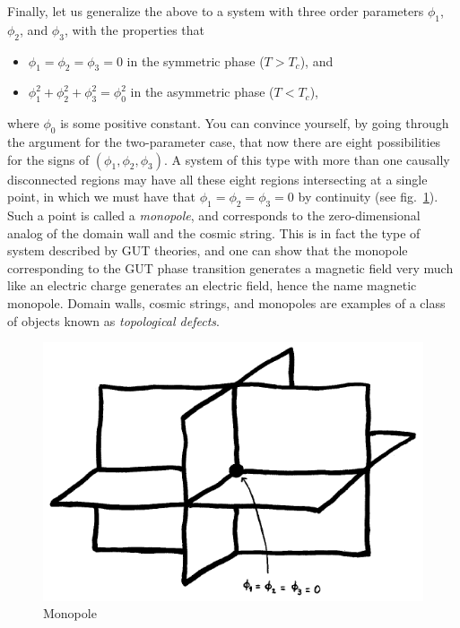 Finally, let us generalize the above to a system with three order parameters $\phi_1$, $\phi_2$, and $\phi_3$, with the properties that
\begin{itemize}
\item [] $\phi_1=\phi_2=\phi_3=0$ in the symmetric phase ($T>T_c$), and
\item [] $\phi_1^2+\phi_2^2+\phi_3^2=\phi_0^2$ in the asymmetric phase ($T<T_c$),
\end{itemize}
where $\phi_0$ is some positive constant. You can convince yourself, by going through the argument for the two-parameter case, that now there are eight possibilities for the signs of $(\phi_1,\phi_2,\phi_3)$. A system of this type with more than one causally disconnected regions may have all these eight regions intersecting at a single point, in which we must have that $\phi_1=\phi_2=\phi_3=0$ by continuity (see fig.\ \ref{fig:lec12_9}). Such a point is called a {\it monopole}, and corresponds to the zero-dimensional analog of the domain wall and the cosmic string. This is in fact the type of system described by GUT theories, and one can show that the monopole corresponding to the GUT phase transition generates a magnetic field very much like an electric charge generates an electric field, hence the name magnetic monopole. Domain walls, cosmic strings, and monopoles are examples of a class of objects known as {\it topological defects}.
\begin{figure}[ht]
\begin{center}
\includegraphics[scale=0.6]{Draw/lec12_9.png}
\end{center}
\caption{Monopole}
\label{fig:lec12_9}
\end{figure}

